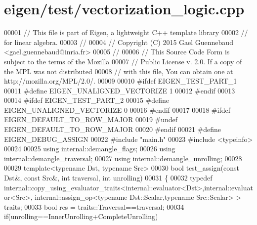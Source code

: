 \hypertarget{eigen_2test_2vectorization__logic_8cpp_source}{}\section{eigen/test/vectorization\+\_\+logic.cpp}
\label{eigen_2test_2vectorization__logic_8cpp_source}

\begin{DoxyCode}
00001 \textcolor{comment}{// This file is part of Eigen, a lightweight C++ template library}
00002 \textcolor{comment}{// for linear algebra.}
00003 \textcolor{comment}{//}
00004 \textcolor{comment}{// Copyright (C) 2015 Gael Guennebaud <gael.guennebaud@inria.fr>}
00005 \textcolor{comment}{//}
00006 \textcolor{comment}{// This Source Code Form is subject to the terms of the Mozilla}
00007 \textcolor{comment}{// Public License v. 2.0. If a copy of the MPL was not distributed}
00008 \textcolor{comment}{// with this file, You can obtain one at http://mozilla.org/MPL/2.0/.}
00009 
00010 \textcolor{preprocessor}{#ifdef EIGEN\_TEST\_PART\_1}
00011 \textcolor{preprocessor}{#define EIGEN\_UNALIGNED\_VECTORIZE 1}
00012 \textcolor{preprocessor}{#endif}
00013 
00014 \textcolor{preprocessor}{#ifdef EIGEN\_TEST\_PART\_2}
00015 \textcolor{preprocessor}{#define EIGEN\_UNALIGNED\_VECTORIZE 0}
00016 \textcolor{preprocessor}{#endif}
00017 
00018 \textcolor{preprocessor}{#ifdef EIGEN\_DEFAULT\_TO\_ROW\_MAJOR}
00019 \textcolor{preprocessor}{#undef EIGEN\_DEFAULT\_TO\_ROW\_MAJOR}
00020 \textcolor{preprocessor}{#endif}
00021 \textcolor{preprocessor}{#define EIGEN\_DEBUG\_ASSIGN}
00022 \textcolor{preprocessor}{#include "main.h"}
00023 \textcolor{preprocessor}{#include <typeinfo>}
00024 
00025 \textcolor{keyword}{using} internal::demangle\_flags;
00026 \textcolor{keyword}{using} internal::demangle\_traversal;
00027 \textcolor{keyword}{using} internal::demangle\_unrolling;
00028 
00029 \textcolor{keyword}{template}<\textcolor{keyword}{typename} Dst, \textcolor{keyword}{typename} Src>
00030 \textcolor{keywordtype}{bool} test\_assign(\textcolor{keyword}{const} Dst&, \textcolor{keyword}{const} Src&, \textcolor{keywordtype}{int} traversal, \textcolor{keywordtype}{int} unrolling)
00031 \{
00032   \textcolor{keyword}{typedef} internal::copy\_using\_evaluator\_traits<internal::evaluator<Dst>,internal::evaluator<Src>, 
      internal::assign\_op<typename Dst::Scalar,typename Src::Scalar> > traits;
00033   \textcolor{keywordtype}{bool} res = traits::Traversal==traversal;
00034   \textcolor{keywordflow}{if}(unrolling==InnerUnrolling+CompleteUnrolling)

\end{DoxyCode}
